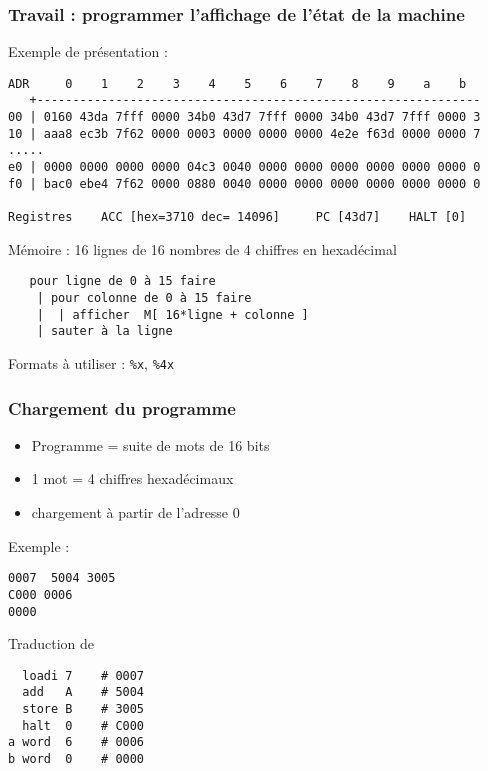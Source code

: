 \documentclass[]{beamer}
\begin{document}
\begin{frame}[containsverbatim]
  \frametitle{Travail : programmer l'affichage de l'état de la machine}


\alert{Exemple de présentation } : 
{
\scriptsize
\begin{lstlisting}
ADR     0    1    2    3    4    5    6    7    8    9    a    b  
   +--------------------------------------------------------------
00 | 0160 43da 7fff 0000 34b0 43d7 7fff 0000 34b0 43d7 7fff 0000 3
10 | aaa8 ec3b 7f62 0000 0003 0000 0000 0000 4e2e f63d 0000 0000 7
.....
e0 | 0000 0000 0000 0000 04c3 0040 0000 0000 0000 0000 0000 0000 0
f0 | bac0 ebe4 7f62 0000 0880 0040 0000 0000 0000 0000 0000 0000 0
 
Registres    ACC [hex=3710 dec= 14096]     PC [43d7]    HALT [0]
\end{lstlisting}
}
\alert{Mémoire} : 16 lignes de 16 nombres de 4 chiffres en hexadécimal 
\begin{lstlisting}
   pour ligne de 0 à 15 faire
    | pour colonne de 0 à 15 faire
    |  | afficher  M[ 16*ligne + colonne ]
    | sauter à la ligne
\end{lstlisting}

\alert{Formats} à utiliser : \texttt{\%x}, \texttt{\%4x} 
\end{frame}



\begin{frame}[containsverbatim]
  \frametitle{Chargement du programme}


\begin{itemize}
\item Programme = suite de mots de 16 bits
\item 1 mot = 4 chiffres hexadécimaux
\item chargement à partir de l'adresse 0
\end{itemize}

Exemple :
\begin{lstlisting}[frame=single]
0007  5004 3005
C000 0006 
0000
\end{lstlisting}

Traduction de 
\begin{verbatim}
  loadi 7    # 0007
  add   A    # 5004
  store B    # 3005
  halt  0    # C000
a word  6    # 0006
b word  0    # 0000
\end{verbatim}
\end{frame}
\end{document}
